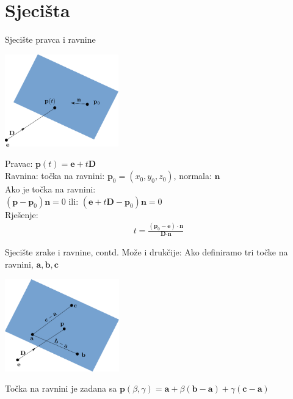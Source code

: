 \documentclass[9pt]{beamer}
\begin{document}
\section{Sjecišta}
\begin{frame}{Sjecište pravca i ravnine}
	\begin{center}
		\includegraphics[height=4cm]{./slike/sjeciste_ravnina_pravac_01.png}
	\end{center}
	Pravac: $\textbf{p}(t) = \textbf{e}+t\textbf{D}$
	\\Ravnina: točka na ravnini: $\textbf{p}_0 = (x_0, y_0, z_0)$, normala: $\textbf{n}$
	\\Ako je točka na ravnini:\\
	$(\textbf{p} - \textbf{p}_0)\textbf{n}=0$
	ili:
	$(\textbf{e} +t\textbf{D}- \textbf{p}_0)\textbf{n}=0$
	\\Rješenje: 
	\begin{align*}
	t = \frac{(\textbf{p}_0-\textbf{e})\cdot\textbf{n}}{\textbf{D}\cdot\textbf{n}}
	\end{align*}
\end{frame}

\begin{frame}{Sjecište zrake i ravnine, contd.}
	Može i drukčije: Ako definiramo tri točke na ravnini, $\mathbf{a}, \mathbf{b}, \mathbf{c}$ 
	\begin{center}
		\includegraphics[height=4cm]{./slike/sjeciste_ravnina_pravac_02.png}
	\end{center}
	Točka na ravnini je zadana sa 
	$\textbf{p}(\beta, \gamma) = \textbf{a} + \beta(\textbf{b}-\textbf{a}) + \gamma(\textbf{c}-\textbf{a})$
\end{frame}	
\end{document}
